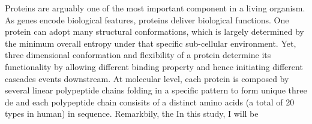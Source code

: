 Proteins are arguably one of the most important component in a living organism. As genes encode biological features, proteins deliver biological functions. One protein can adopt many structural conformations, which is largely determined by the minimum overall entropy under that specific sub-cellular environment. Yet, three dimensional conformation and flexibility of a protein determine its functionality by allowing different binding property and hence initiating different cascades events downstream. At molecular level, each protein is composed by several linear polypeptide chains folding in a specific pattern to form unique three de and each polypeptide chain consisits of a distinct amino acids (a total of 20 types in human) in sequence. Remarkbily, the  In this study, I will be 